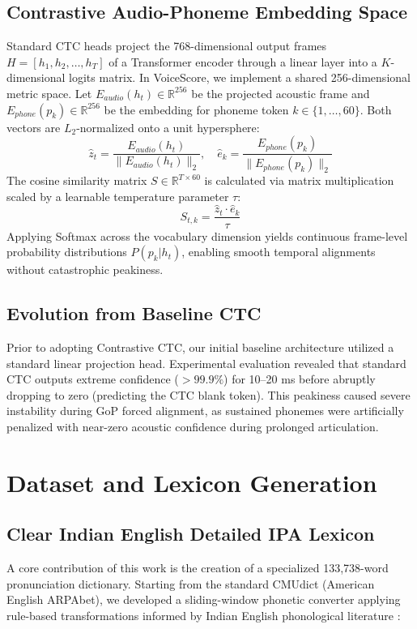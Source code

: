 \documentclass[11pt,a4paper]{article}
\begin{document}
\subsection{Contrastive Audio-Phoneme Embedding Space}
Standard CTC heads project the 768-dimensional output frames $H = [h_1, h_2, \dots, h_T]$ of a Transformer encoder through a linear layer into a $K$-dimensional logits matrix. In VoiceScore, we implement a shared 256-dimensional metric space. Let $E_{audio}(h_t) \in \mathbb{R}^{256}$ be the projected acoustic frame and $E_{phone}(p_k) \in \mathbb{R}^{256}$ be the embedding for phoneme token $k \in \{1, \dots, 60\}$. Both vectors are $L_2$-normalized onto a unit hypersphere:
\begin{equation}
    \hat{z}_t = \frac{E_{audio}(h_t)}{\|E_{audio}(h_t)\|_2}, \quad \hat{e}_k = \frac{E_{phone}(p_k)}{\|E_{phone}(p_k)\|_2}
\end{equation}
The cosine similarity matrix $S \in \mathbb{R}^{T \times 60}$ is calculated via matrix multiplication scaled by a learnable temperature parameter $\tau$:
\begin{equation}
    S_{t, k} = \frac{\hat{z}_t \cdot \hat{e}_k}{\tau}
\end{equation}
Applying Softmax across the vocabulary dimension yields continuous frame-level probability distributions $P(p_k | h_t)$, enabling smooth temporal alignments without catastrophic peakiness.

\subsection{Evolution from Baseline CTC}
Prior to adopting Contrastive CTC, our initial baseline architecture utilized a standard linear projection head. Experimental evaluation revealed that standard CTC outputs extreme confidence ($>99.9\%$) for 10--20 ms before abruptly dropping to zero (predicting the CTC blank token). This peakiness caused severe instability during GoP forced alignment, as sustained phonemes were artificially penalized with near-zero acoustic confidence during prolonged articulation.

\section{Dataset and Lexicon Generation}\label{sec4}

\subsection{Clear Indian English Detailed IPA Lexicon}
A core contribution of this work is the creation of a specialized 133,738-word pronunciation dictionary. Starting from the standard CMUdict (American English ARPAbet), we developed a sliding-window phonetic converter applying rule-based transformations informed by Indian English phonological literature \cite{pandey2019iecps, pandey2021indian}:
\end{document}
